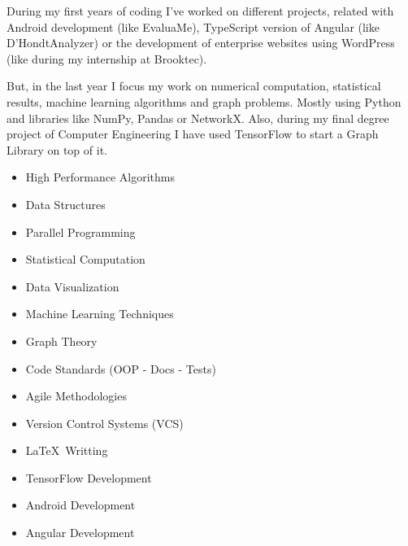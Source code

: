 \documentclass[]{friggeri-cv} %
\begin{document}
        During my first years of coding I've worked on different projects, related with Android development (like EvaluaMe), TypeScript version of Angular (like D'HondtAnalyzer) or the development of enterprise websites using WordPress (like during my internship at Brooktec).

        But, in the last year I focus my work on numerical computation, statistical results, machine learning algorithms and graph problems. Mostly using Python and libraries like NumPy, Pandas or NetworkX. Also, during my final degree project of Computer Engineering I have used TensorFlow to start a Graph Library on top of it.

        \noindent
        \begin{minipage}[t]{0.5\linewidth}
          \begin{itemize}
          	\item{High Performance Algorithms}
      	    \item{Data Structures}
            \item{Parallel Programming}
            \item{Statistical Computation}
            \item{Data Visualization}
            \item{Machine Learning Techniques}
            \item{Graph Theory}
          \end{itemize}
        \end{minipage}%
        \begin{minipage}[t]{0.5\linewidth}
          \begin{itemize}
            \item{Code Standards (OOP - Docs - Tests)}
            \item{Agile Methodologies}
            \item{Version Control Systems (VCS)}
          	\item{\LaTeX \ Writting}
            \item{TensorFlow Development}
            \item{Android Development}
            \item{Angular Development}
          \end{itemize}
        \end{minipage}
        \par\bigskip

\end{document}
